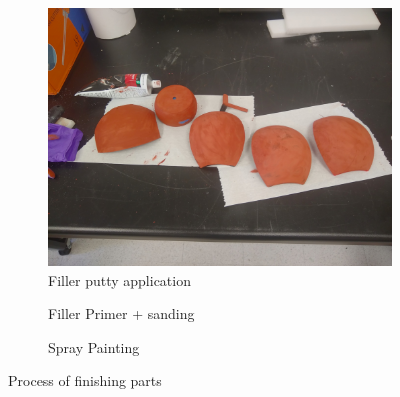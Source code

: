 \begin{figure}
\centering
\begin{subfigure}{0.3\textwidth}
    \includegraphics[width=\textwidth]{Thesis/ch3/manufact-1.jpg}
    \caption{Filler putty application}
\end{subfigure}
\hfill
\begin{subfigure}{0.3\textwidth}
    \caption{Filler Primer + sanding}
\end{subfigure}
\hfill
\begin{subfigure}{0.3\textwidth}
    \caption{Spray Painting}
\end{subfigure}
\caption{Process of finishing parts}
\label{fig:manufact}
\end{figure}

